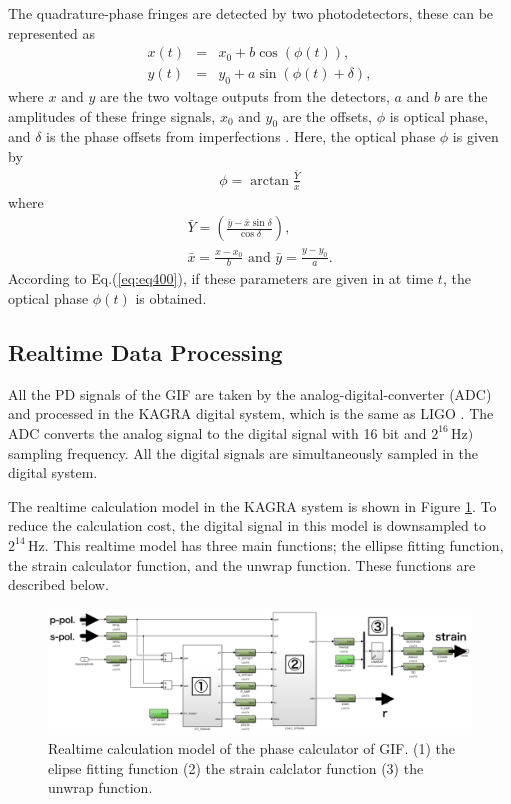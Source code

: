 The quadrature-phase fringes are detected by two photodetectors, these can be represented as 
\begin{eqnarray}
  x(t) &=& x_0 + b \cos(\phi(t)), \label{eq:eq450b} \\
  y(t) &=& y_0 + a \sin(\phi(t)+\delta), \label{eq:eq450a}  
\end{eqnarray}
where $x$ and $y$ are the two voltage outputs from the detectors, $a$ and $b$ are the amplitudes of these fringe signals, $x_0$ and $y_0$ are the offsets, $\phi$ is optical phase, and $\delta$ is the phase offsets from imperfections \cite{zumberge2004resolving}. Here, the optical phase $\phi$ is given by
\begin{eqnarray}
  \phi = \arctan {\frac{\bar{Y}}{\bar{x}}} \label{eq:eq440c}
\end{eqnarray}
where 
\begin{eqnarray}\label{eq:eq440a} 
  \bar{Y} = \left(\frac{\bar{y}-\bar{x}\sin{\delta}}{\cos{\delta}}\right), \\
  \bar{x} = \frac{x-x_0}{b}\,\,\mathrm{and}\,\,\bar{y} = \frac{y-y_0}{a}. \label{eq:eq440b}
\end{eqnarray}
According to Eq.(\ref{eq:eq400}), if these parameters are given in at time $t$, the optical phase $\phi(t)$ is obtained.


\subsection{Realtime Data Processing} \label{sec:142}
All the PD signals of the GIF are taken by the analog-digital-converter (ADC) and processed in the KAGRA digital system, which is the same as LIGO \cite{bork2001overview}. The ADC converts the analog signal to the digital signal with 16 bit and $2^{16}\,\mathrm{Hz})$ sampling frequency. All the digital signals are simultaneously sampled in the digital system. 

The realtime calculation model in the KAGRA system is shown in Figure  \ref{img:img420}. To reduce the calculation cost, the digital signal in this model is downsampled to $2^{14}\,\mathrm{Hz}$. This realtime model has three main functions; the ellipse fitting function, the strain calculator function, and the unwrap function. These functions are described below.
\begin{figure}[h]
  \centering
  \includegraphics[width=15.0cm]{./img_chap4/img420.png}
  \caption{Realtime calculation model of the phase calculator of GIF. (1) the elipse fitting function (2) the strain calclator function (3) the unwrap function.}\label{img:img420}
\end{figure}

